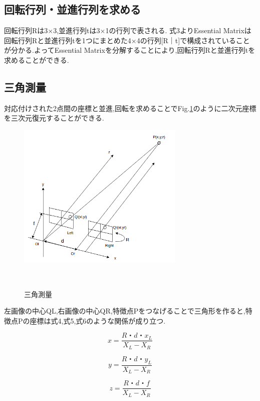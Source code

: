 \documentclass[a4paper]{jarticle}
\begin{document}
\subsection{回転行列・並進行列を求める}
回転行列Rは3×3,並進行列tは3×1の行列で表される.
式3よりEssential Matrixは回転行列Rと並進行列tを1つにまとめた4×4の行列[R｜t]で構成されていることが分かる.よってEssential Matrixを分解することにより,回転行列Rと並進行列tを求めることができる.

\subsection{三角測量}
対応付けされた2点間の座標と並進,回転を求めることでFig.\ref{fig:05}のように二次元座標を三次元復元することができる.

\begin{figure}[b]
 \begin{center}
  \includegraphics[width=80mm]{image/index.jpeg}
 　\caption{三角測量}%
 　\label{fig:05}%
 \end{center}
\end{figure}

左画像の中心Q{\scriptsize L},右画像の中心Q{\scriptsize R},特徴点Pをつなげることで三角形を作ると,特徴点Pの座標は式4,式5,式6のような関係が成り立つ.

\begin{equation}
 x=\frac {R・d・x_{L}}{X_{L}-X_{R}}
\end{equation}

\begin{equation}
 y=\frac {R・d・y_{L}}{X_{L}-X_{R}}
\end{equation}

\begin{equation}
 z=\frac {R・d・f}{X_{L}-X_{R}}
\end{equation}
\end{document}
